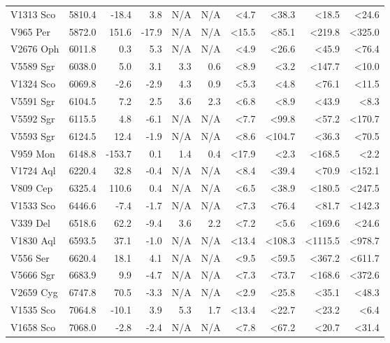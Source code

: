 \documentclass{aa}
\begin{document}
\begin{longtable}{lrrrrrrrrr}
	V1313 Sco &  5810.4 &  -18.4 &   3.8 &   N/A &       N/A &   <4.7 &   <38.3 &    <18.5 &   <24.6 \\
	V965 Per &  5872.0 &  151.6 & -17.9 &   N/A &       N/A &  <15.5 &   <85.1 &   <219.8 &  <325.0 \\
	V2676 Oph &  6011.8 &    0.3 &   5.3 &   N/A &       N/A &   <4.9 &   <26.6 &    <45.9 &   <76.4 \\
	V5589 Sgr &  6038.0 &    5.0 &   3.1 &   3.3 &       0.6 &   <8.9 &    <3.2 &   <147.7 &   <10.0 \\
	V1324 Sco &  6069.8 &   -2.6 &  -2.9 &   4.3 &       0.9 &   <5.3 &    <4.8 &    <76.1 &   <11.5 \\
	V5591 Sgr &  6104.5 &    7.2 &   2.5 &   3.6 &       2.3 &   <6.8 &    <8.9 &    <43.9 &    <8.3 \\
	V5592 Sgr &  6115.5 &    4.8 &  -6.1 &   N/A &       N/A &   <7.7 &   <99.8 &    <57.2 &  <170.7 \\
	V5593 Sgr &  6124.5 &   12.4 &  -1.9 &   N/A &       N/A &   <8.6 &  <104.7 &    <36.3 &   <70.5 \\
	V959 Mon &  6148.8 & -153.7 &   0.1 &   1.4 &       0.4 &  <17.9 &    <2.3 &   <168.5 &    <2.2 \\
	V1724 Aql &  6220.4 &   32.8 &  -0.4 &   N/A &       N/A &   <8.4 &   <39.4 &    <70.9 &  <152.1 \\
	V809 Cep &  6325.4 &  110.6 &   0.4 &   N/A &       N/A &   <6.5 &   <38.9 &   <180.5 &  <247.5 \\
	V1533 Sco &  6446.6 &   -7.4 &  -1.7 &   N/A &       N/A &   <7.3 &   <76.4 &    <81.7 &  <142.3 \\
	V339 Del &  6518.6 &   62.2 &  -9.4 &   3.6 &       2.2 &   <7.2 &    <5.6 &   <169.6 &   <24.6 \\
	V1830 Aql &  6593.5 &   37.1 &  -1.0 &   N/A &       N/A &  <13.4 &  <108.3 &  <1115.5 &  <978.7 \\
	V556 Ser &  6620.4 &   18.1 &   4.1 &   N/A &       N/A &   <9.5 &   <59.5 &   <367.2 &  <611.7 \\
	V5666 Sgr &  6683.9 &    9.9 &  -4.7 &   N/A &       N/A &   <7.3 &   <73.7 &   <168.6 &  <372.6 \\
	V2659 Cyg &  6747.8 &   70.5 &  -3.3 &   N/A &       N/A &   <2.9 &   <25.8 &    <35.1 &   <48.3 \\
	V1535 Sco &  7064.8 &  -10.1 &   3.9 &   5.3 &       1.7 &  <13.4 &   <22.7 &    <23.2 &    <6.4 \\
	V1658 Sco &  7068.0 &   -2.8 &  -2.4 &   N/A &       N/A &   <7.8 &   <67.2 &    <20.7 &   <31.4 \\

\end{longtable}
\end{document}
